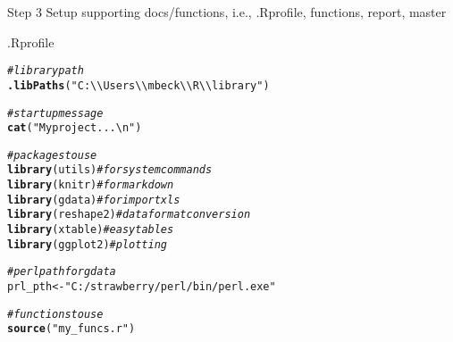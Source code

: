 \documentclass[xcolor=svgnames]{beamer}\usepackage[]{graphicx}\usepackage[]{color}
\makeatletter
\newcommand{\hlstr}[1]{\textcolor[rgb]{0.192,0.494,0.8}{#1}}%
\newcommand{\hlcom}[1]{\textcolor[rgb]{0.678,0.584,0.686}{\textit{#1}}}%
\newcommand{\hlstd}[1]{\textcolor[rgb]{0.345,0.345,0.345}{#1}}%
\newcommand{\hlkwb}[1]{\textcolor[rgb]{0.69,0.353,0.396}{#1}}%
\newcommand{\hlkwd}[1]{\textcolor[rgb]{0.737,0.353,0.396}{\textbf{#1}}}%
\newenvironment{kframe}{%
 \def\at@end@of@kframe{}%
 \ifinner\ifhmode%
  \def\at@end@of@kframe{\end{minipage}}%
  \begin{minipage}{\columnwidth}%
 \fi\fi%
 \def\FrameCommand##1{\hskip\@totalleftmargin \hskip-\fboxsep
 \colorbox{shadecolor}{##1}\hskip-\fboxsep
     \hskip-\linewidth \hskip-\@totalleftmargin \hskip\columnwidth}%
 \MakeFramed {\advance\hsize-\width
   \@totalleftmargin\z@ \linewidth\hsize
   \@setminipage}}%
 {\par\unskip\endMakeFramed%
 \at@end@of@kframe}
\newenvironment{knitrout}{}{} %
\makeatother
\begin{document}
\begin{frame}[fragile]{Step 3}
Setup supporting docs/functions, i.e., .Rprofile, functions, report, master
\scriptsize
\begin{block}{.Rprofile}
\begin{knitrout}
\color{fgcolor}\begin{kframe}
\begin{alltt}
\hlcom{# library path}
\hlkwd{.libPaths}\hlstd{(}\hlstr{"C:\textbackslash{}\textbackslash{}Users\textbackslash{}\textbackslash{}mbeck\textbackslash{}\textbackslash{}R\textbackslash{}\textbackslash{}library"}\hlstd{)}

\hlcom{# startup message}
\hlkwd{cat}\hlstd{(}\hlstr{"My project...\textbackslash{}n"}\hlstd{)}

\hlcom{# packages to use}
\hlkwd{library}\hlstd{(utils)}  \hlcom{# for system commands}
\hlkwd{library}\hlstd{(knitr)}  \hlcom{# for markdown}
\hlkwd{library}\hlstd{(gdata)}  \hlcom{# for import xls}
\hlkwd{library}\hlstd{(reshape2)}  \hlcom{# data format conversion}
\hlkwd{library}\hlstd{(xtable)}  \hlcom{# easy tables}
\hlkwd{library}\hlstd{(ggplot2)}  \hlcom{# plotting}

\hlcom{# perl path for gdata}
\hlstd{prl_pth} \hlkwb{<-} \hlstr{"C:/strawberry/perl/bin/perl.exe"}

\hlcom{# functions to use}
\hlkwd{source}\hlstd{(}\hlstr{"my_funcs.r"}\hlstd{)}
\end{alltt}
\end{kframe}
\end{knitrout}

\end{block}
\end{frame}
\end{document}
